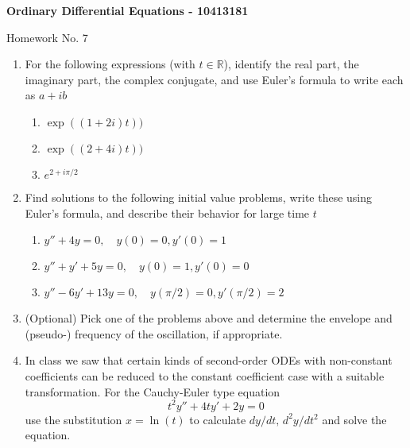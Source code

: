 \documentclass[10pt,a4paper]{letter}
\begin{document}
\begin{center}
\begin{Large}
\textbf{Ordinary Differential Equations - 10413181}\\
\end{Large}
\vspace{1em}
\begin{large}Homework No. 7\end{large}
\end{center}

\begin{enumerate}
\item For the following expressions (with $t \in \mathbb{R}$), identify the real part, the imaginary part, the complex conjugate, and use Euler's formula to write each as $a + i b$
\begin{enumerate}
\item $ \exp((1+2i)t))$
\item $ \exp((2+4i)t))$
\item $e^{2 + i\pi/2}$
\end{enumerate}
\item Find solutions to the following initial value problems, write these using Euler's formula, and describe their behavior for large time $t$
\begin{enumerate}
\item $y'' + 4y = 0, \quad y(0) = 0, y'(0)=1 $
\item $y'' + y' + 5y = 0, \quad y(0) = 1, y'(0) = 0$
\item $y'' - 6y' + 13y = 0, \quad y(\pi/2) = 0, y'(\pi/2) = 2$ 
\end{enumerate}
\item (Optional) Pick one of the problems above and determine the envelope and (pseudo-) frequency of the oscillation, if appropriate.
\item In class we saw that certain kinds of second-order ODEs with non-constant coefficients can be reduced to the constant coefficient case with a suitable transformation. For the Cauchy-Euler type equation
\[ t^2 y'' + 4ty' + 2y =0 \]
use the substitution $x = \ln(t)$ to calculate $dy/dt, \, d^2 y/d t^2$ and solve the equation.
\end{enumerate}
\end{document}
